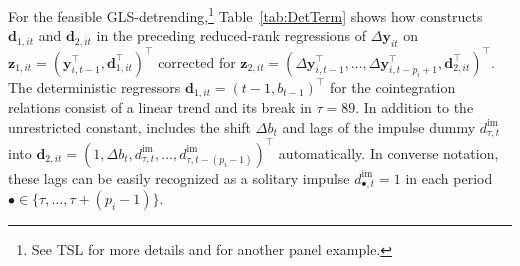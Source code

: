 For the feasible GLS-detrending,\footnote{See TSL \citeyearpar[p.~335]{TrenklerEtAl2008} for more details and \citet[Ch.~6]{ArsovaOersal2021} for another panel example.} Table~\ref{tab:DetTerm} shows how  constructs $ \boldsymbol{d}_{1,it} $ and $ \boldsymbol{d}_{2,it} $ in the preceding reduced-rank regressions of $ \Delta \boldsymbol{y}_{it} $ on $ \boldsymbol{z}_{1,it} = \left( \boldsymbol{y}_{i,t-1}^\top, \boldsymbol{d}_{1,it}^\top \right)^\top $ corrected for $ \boldsymbol{z}_{2,it} = \left( \Delta \boldsymbol{y}_{i,t-1}^\top, \ldots, \Delta \boldsymbol{y}_{i,t-p_i+1}^\top, \boldsymbol{d}_{2,it}^\top \right)^\top $. The deterministic regressors $ \boldsymbol{d}_{1,it} = \left( t-1, b_{t-1}^{\ } \right)^\top $ for the cointegration relations consist of a linear trend and its break in $ \tau=89 $. In addition to the unrestricted constant,  includes the shift $ \Delta b_{t} $ and lags of the impulse dummy $  d^{\text{im}}_{\tau,t} $ into $ \boldsymbol{d}_{2,it} = \left( 1, \Delta b_{t}^{\ }, d^{\text{im}}_{\tau,t}, \ldots, d^{\text{im}}_{\tau,t-(p_i-1)} \right)^\top $ automatically. In converse notation, these lags can be easily recognized as a solitary impulse $  d^{\text{im}}_{\bullet,t} = 1 $ in each period $ \bullet \in \{ \tau, \ldots, \tau+(p_i-1)\} $. %


